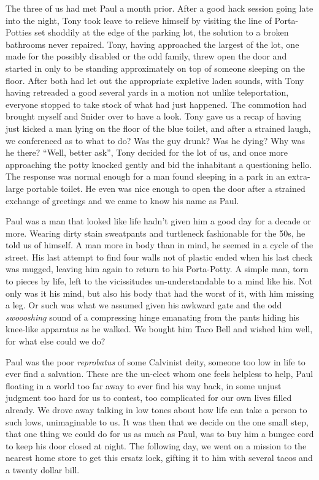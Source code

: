 \documentclass[ebook, 10pt, openright, onecolumn]{memoir}
\begin{document}
The three of us had met Paul a month prior.  After a good hack session going
late into the night, Tony took leave to relieve himself by visiting the line of
Porta-Potties set shoddily at the edge of the parking lot, the solution to a
broken bathrooms never repaired.  Tony, having approached the largest of the
lot, one made for the possibly disabled or the odd family, threw open the door
and started in only to be standing approximately on top of someone sleeping on
the floor.  After both had let out the appropriate expletive laden sounds, with
Tony having retreaded a good several yards in a motion not unlike teleportation,
everyone stopped to take stock of what had just happened.  The commotion had
brought myself and Snider over to have a look.  Tony gave us a recap of having
just kicked a man lying on the floor of the blue toilet, and after a strained
laugh, we conferenced as to what to do?  Was the guy drunk?  Was he dying?  Why
was he there?  ``Well, better ask'', Tony decided for the lot of us, and once
more approaching the potty knocked gently and bid the inhabitant a questioning
hello.  The response was normal enough for a man found sleeping in a park in an
extra-large portable toilet.  He even was nice enough to open the door after a
strained exchange of greetings and we came to know his name as Paul.

Paul was a man that looked like life hadn't given him a good day for a decade or
more.  Wearing dirty stain sweatpants and turtleneck fashionable for the 50s, he
told us of himself.  A man more in body than in mind, he seemed in a cycle of
the street.  His last attempt to find four walls not of plastic ended when his
last check was mugged, leaving him again to return to his Porta-Potty.  A simple
man, torn to pieces by life, left to the vicissitudes un-understandable to a
mind like his. Not only was it his mind, but also his body that had the worst of
it, with him missing a leg. Or such was what we assumed given his awkward gate
and the odd \textit{swoooshing} sound of a compressing hinge emanating from the
pants hiding his knee-like apparatus as he walked.  We bought him Taco Bell and
wished him well, for what else could we do?

Paul was the poor \textit{reprobatus} of some Calvinist deity, someone too low
in life to ever find a salvation.  These are the un-elect whom one feels helpless to
help, Paul floating in a world too far away to ever find his way back, in some unjust
judgment too hard for us to contest, too complicated for our own lives filled
already.  We drove away talking in low tones about how life can take a person to
such lows, unimaginable to us.  It was then that we decide on the one small
step, that one thing we could do for us as much as Paul, was to buy him a bungee
cord to keep his door closed at night.  The following day, we went on a mission
to the nearest home store to get this ersatz lock, gifting it to him with
several tacos and a twenty dollar bill.
\end{document}
